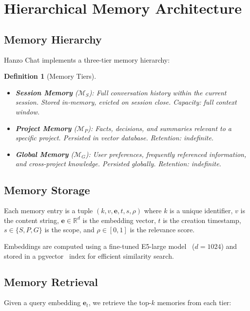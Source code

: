 \documentclass[11pt,twocolumn]{article}
\newtheorem{definition}{Definition}
\begin{document}
\section{Hierarchical Memory Architecture}
\label{sec:memory}

\subsection{Memory Hierarchy}

Hanzo Chat implements a three-tier memory hierarchy:

\begin{definition}[Memory Tiers]
\begin{itemize}[leftmargin=1.1em]
    \item \textbf{Session Memory} ($\mathcal{M}_S$): Full conversation history within the current session. Stored in-memory, evicted on session close. Capacity: full context window.
    \item \textbf{Project Memory} ($\mathcal{M}_P$): Facts, decisions, and summaries relevant to a specific project. Persisted in vector database. Retention: indefinite.
    \item \textbf{Global Memory} ($\mathcal{M}_G$): User preferences, frequently referenced information, and cross-project knowledge. Persisted globally. Retention: indefinite.
\end{itemize}
\end{definition}

\subsection{Memory Storage}

Each memory entry is a tuple $(k, v, \bm{e}, t, s, \rho)$ where $k$ is a unique identifier, $v$ is the content string, $\bm{e} \in \mathbb{R}^d$ is the embedding vector, $t$ is the creation timestamp, $s \in \{S, P, G\}$ is the scope, and $\rho \in [0, 1]$ is the relevance score.

Embeddings are computed using a fine-tuned E5-large model~\cite{wang2022text} ($d = 1024$) and stored in a pgvector~\cite{pgvector2023} index for efficient similarity search.

\subsection{Memory Retrieval}

Given a query embedding $\bm{e}_t$, we retrieve the top-$k$ memories from each tier:
\end{document}
